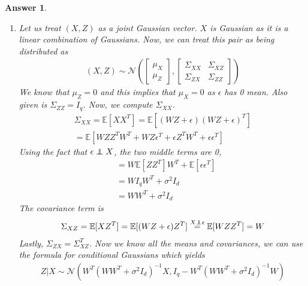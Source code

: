 \documentclass[12pt]{article}
\newcommand\independent{\protect\mathpalette{\protect\independenT}{\perp}}
\def\independenT#1#2{\mathrel{\rlap{$#1#2$}\mkern2mu{#1#2}}}
\theoremstyle{colon}
\newtheorem*{answer}{Answer}
\begin{document}
\begin{answer}
  \leavevmode
  \begin{enumerate}[label=\arabic*)]
    \item Let us treat $(X,Z)$ as a joint Gaussian vector. $X$ is Gaussian as it is a linear combination of Gaussians. Now, we can treat this pair as being distributed as
      \begin{gather*}
        (X,Z) \sim \mathcal{N} \left( \begin{bmatrix} \mu_X \\ \mu_Z \end{bmatrix}, \begin{bmatrix} \Sigma_{XX} & \Sigma_{XZ} \\ \Sigma_{ZX} & \Sigma_{ZZ} \end{bmatrix} \right)
      \end{gather*}
      We know that $\mu_Z = 0$ and this implies that $\mu_X = 0$ as $\epsilon$ has 0 mean. Also given is $\Sigma_{ZZ} = I_q$. Now, we compute $\Sigma_{XX}$.
      \begin{gather*}
        \Sigma_{XX} = \mathbb{E}[X X^T] = \mathbb{E}[(WZ + \epsilon)(WZ + \epsilon)^T] \\
        = \mathbb{E}[WZZ^TW^T + WZ \epsilon^T + \epsilon Z^T W^T + \epsilon \epsilon^T]
      \end{gather*}
      Using the fact that $\epsilon \independent X$, the two middle terms are 0,
      \begin{align*}
        &= W \mathbb{E}[ZZ^T] W^T + \mathbb{E}[\epsilon \epsilon^T] \\
        &= W I_q W^T + \sigma^2 I_d \\
        &= W W^T + \sigma^2 I_d
      \end{align*}
      The covariance term is
      \begin{gather*}
        \Sigma_{XZ} = \mathbb{E}[X Z^T] = \mathbb{E}[(WZ + \epsilon) Z^T] \stackrel{X \independent \epsilon}{=} \mathbb{E}[WZ Z^T] = W
      \end{gather*}
      Lastly, $\Sigma_{ZX} = \Sigma_{XZ}^T$. Now we know all the means and covariances, we can use the formula for conditional Gaussians which yields
      \begin{gather*}
        Z | X \sim \mathcal{N}(W^T (W W^T + \sigma^2 I_d)^{-1} X, I_q - W^T (W W^T + \sigma^2 I_d)^{-1} W )
      \end{gather*}


\end{enumerate}
\end{answer}
\end{document}
